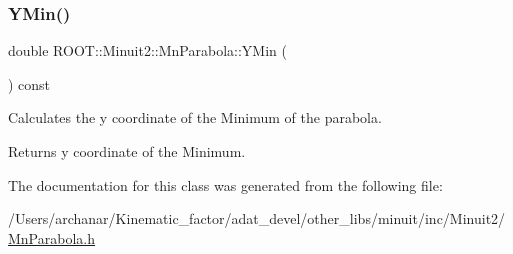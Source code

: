 \subsubsection{\texorpdfstring{YMin()}{YMin()}\hspace{0.1cm}{\footnotesize\ttfamily [2/2]}}
{\footnotesize\ttfamily double R\+O\+O\+T\+::\+Minuit2\+::\+Mn\+Parabola\+::\+Y\+Min (\begin{DoxyParamCaption}{ }\end{DoxyParamCaption}) const\hspace{0.3cm}{\ttfamily [inline]}}

Calculates the y coordinate of the Minimum of the parabola.

\begin{DoxyReturn}{Returns}
y coordinate of the Minimum. 
\end{DoxyReturn}


The documentation for this class was generated from the following file\+:\begin{DoxyCompactItemize}
\item 
/\+Users/archanar/\+Kinematic\+\_\+factor/adat\+\_\+devel/other\+\_\+libs/minuit/inc/\+Minuit2/\mbox{\hyperlink{other__libs_2minuit_2inc_2Minuit2_2MnParabola_8h}{Mn\+Parabola.\+h}}\end{DoxyCompactItemize}
